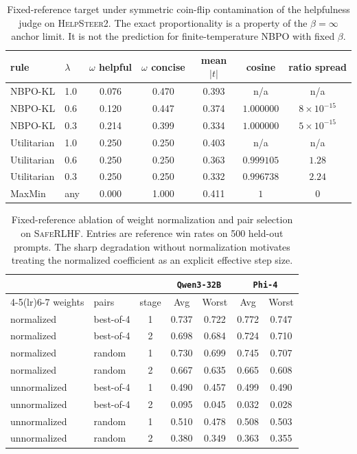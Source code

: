 \documentclass{article}
\theoremstyle{remark}
\theoremstyle{plain}
\newcommand{\NBPO}{\textsc{NBPO}}
\begin{document}
\begin{table}[t]
\centering\footnotesize
\caption{Fixed-reference target under symmetric coin-flip contamination of the helpfulness judge on \textsc{HelpSteer2}. The exact proportionality is a property of the $\beta=\infty$ anchor limit. It is not the prediction for finite-temperature \NBPO{} with fixed $\beta$.}
\label{tab:legacy-cov}
\begin{tabular}{llccccc}
\toprule
rule & $\lambda$ & $\omega$ helpful & $\omega$ concise & mean $|t|$ & cosine & ratio spread \\
\midrule
NBPO-KL & 1.0 & 0.076 & 0.470 & 0.393 & n/a & n/a \\
NBPO-KL & 0.6 & 0.120 & 0.447 & 0.374 & $1.000000$ & $8\times10^{-15}$ \\
NBPO-KL & 0.3 & 0.214 & 0.399 & 0.334 & $1.000000$ & $5\times10^{-15}$ \\
\midrule
Utilitarian & 1.0 & 0.250 & 0.250 & 0.403 & n/a & n/a \\
Utilitarian & 0.6 & 0.250 & 0.250 & 0.363 & $0.999105$ & $1.28$ \\
Utilitarian & 0.3 & 0.250 & 0.250 & 0.332 & $0.996738$ & $2.24$ \\
\midrule
MaxMin & any & 0.000 & 1.000 & 0.411 & $1$ & $0$ \\
\bottomrule
\end{tabular}
\end{table}

\begin{table}[t]
\centering\footnotesize
\caption{Fixed-reference ablation of weight normalization and pair selection on \textsc{SafeRLHF}. Entries are reference win rates on 500 held-out prompts. The sharp degradation without normalization motivates treating the normalized coefficient as an explicit effective step size.}
\label{tab:legacy-sr-ablation}
\begin{tabular}{llccccc}
\toprule
& & & \multicolumn{2}{c}{\texttt{Qwen3-32B}} & \multicolumn{2}{c}{\texttt{Phi-4}} \\
\cmidrule(lr){4-5}\cmidrule(lr){6-7}
weights & pairs & stage & Avg & Worst & Avg & Worst \\
\midrule
normalized & best-of-4 & 1 & 0.737 & 0.722 & 0.772 & 0.747 \\
normalized & best-of-4 & 2 & 0.698 & 0.684 & 0.724 & 0.710 \\
normalized & random & 1 & 0.730 & 0.699 & 0.745 & 0.707 \\
normalized & random & 2 & 0.667 & 0.635 & 0.665 & 0.608 \\
\midrule
unnormalized & best-of-4 & 1 & 0.490 & 0.457 & 0.499 & 0.490 \\
unnormalized & best-of-4 & 2 & 0.095 & 0.045 & 0.032 & 0.028 \\
unnormalized & random & 1 & 0.510 & 0.478 & 0.508 & 0.503 \\
unnormalized & random & 2 & 0.380 & 0.349 & 0.363 & 0.355 \\
\bottomrule
\end{tabular}
\end{table}
\end{document}
